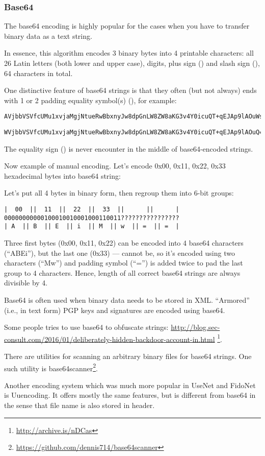 \subsubsection{Base64}

The base64 encoding is highly popular for the cases when you have to transfer binary data as a text string.

In essence, this algorithm encodes 3 binary bytes into 4 printable characters:
all 26 Latin letters (both lower and upper case), digits, plus sign (\q{+}) and slash sign (\q{/}),
64 characters in total.

One distinctive feature of base64 strings is that they often (but not always) ends with 1 or 2 \gls{padding}
equality symbol(s) (\q{=}), for example:

\begin{lstlisting}
AVjbbVSVfcUMu1xvjaMgjNtueRwBbxnyJw8dpGnLW8ZW8aKG3v4Y0icuQT+qEJAp9lAOuWs=
\end{lstlisting}

\begin{lstlisting}
WVjbbVSVfcUMu1xvjaMgjNtueRwBbxnyJw8dpGnLW8ZW8aKG3v4Y0icuQT+qEJAp9lAOuQ==
\end{lstlisting}

The equality sign (\q{=}) is never encounter in the middle of base64-encoded strings.

Now example of manual encoding.
Let's encode 0x00, 0x11, 0x22, 0x33 hexadecimal bytes into base64 string:



Let's put all 4 bytes in binary form, then regroup them into 6-bit groups:

\begin{lstlisting}
|  00  ||  11  ||  22  ||  33  ||      ||      |
00000000000100010010001000110011????????????????
| A  || B  || E  || i  || M  || w  || =  || =  |
\end{lstlisting}

Three first bytes (0x00, 0x11, 0x22) can be encoded into 4 base64 characters (``ABEi''),
but the last one (0x33) --- cannot be,
so it's encoded using two characters (``Mw'') and \gls{padding} symbol (``='')
is added twice to pad the last group to 4 characters.
Hence, length of all correct base64 strings are always divisible by 4.

Base64 is often used when binary data needs to be stored in XML.
``Armored'' (i.e., in text form) PGP keys and signatures are encoded using base64.

Some people tries to use base64 to obfuscate strings:
\url{http://blog.sec-consult.com/2016/01/deliberately-hidden-backdoor-account-in.html}
\footnote{\url{http://archive.is/nDCas}}.

There are utilities for scanning an arbitrary binary files for base64 strings.
One such utility is base64scanner\footnote{\url{https://github.com/dennis714/base64scanner}}.

Another encoding system which was much more popular in UseNet and FidoNet is Uuencoding.
It offers mostly the same features, but is different from base64 in the sense that file name
is also stored in header.
